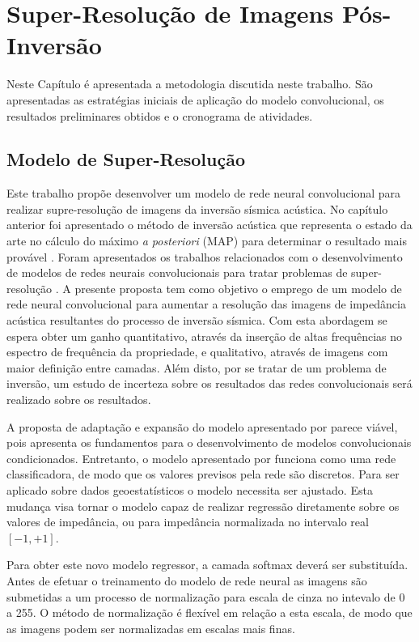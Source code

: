 \chapter{Super-Resolução de Imagens Pós-Inversão}
\label{cap:3modeloHibrido}

Neste Capítulo é apresentada a metodologia discutida neste trabalho.
São apresentadas as estratégias iniciais de aplicação do modelo convolucional,
os resultados preliminares obtidos e o cronograma de atividades.

\section{Modelo de Super-Resolução}

Este trabalho propõe desenvolver um modelo de rede neural convolucional para
realizar supre-resolução de imagens da inversão sísmica acústica.
No capítulo anterior foi apresentado o método de inversão acústica que
representa o estado da arte no cálculo do máximo \textit{a posteriori} (MAP) para determinar o
resultado mais provável \citep{Buland01012003, Figueiredo2014}. Foram apresentados os trabalhos relacionados
com o desenvolvimento de modelos de redes neurais convolucionais para tratar problemas de
super-resolução \citep{Oord16,He2016,DahlNS17}. 
% 
A presente proposta tem como objetivo o emprego de um modelo de rede neural convolucional
para aumentar a resolução das imagens de impedância acústica
resultantes do processo de inversão sísmica. Com esta abordagem se espera obter um ganho
quantitativo, através da inserção de altas frequências no espectro de frequência da
propriedade, e qualitativo, através de imagens com maior definição entre camadas.
Além disto, por se tratar de um problema de inversão, um estudo de incerteza sobre os
resultados das redes convolucionais será realizado sobre os resultados.

A proposta de adaptação e expansão do modelo apresentado por
\cite{DahlNS17} parece viável, pois apresenta os fundamentos para o desenvolvimento
de modelos convolucionais condicionados. Entretanto, o modelo apresentado por
\cite{} funciona como uma rede classificadora, de modo que os valores previsos
pela rede são discretos. Para ser aplicado sobre dados geoestatísticos o modelo
necessita ser ajustado. Esta mudança visa tornar o modelo capaz de realizar regressão
diretamente sobre os valores de impedância, ou para impedância normalizada no intervalo real
$[-1,+1]$.

Para obter este novo modelo regressor, a camada softmax deverá ser substituída.
Antes de efetuar o treinamento do modelo de rede neural as imagens são submetidas a
um processo de normalização para escala de cinza no intevalo de 0 a 255.
O método de normalização é flexível em relação a esta escala, de modo que as imagens
podem ser normalizadas em escalas mais finas.

